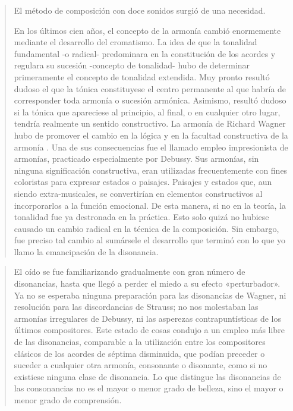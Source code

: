     \begin{quote}
    	El método de composición con doce sonidos surgió de una necesidad.
    	
    	En los últimos cien años, el concepto de la armonía cambió enormemente mediante el desarrollo del cromatismo. La idea de que la tonalidad fundamental -o radical- predominara en la constitución de los acordes y regulara su sucesión -concepto de tonalidad- hubo de determinar primeramente el concepto de tonalidad extendida. Muy pronto resultó dudoso el que la tónica constituyese el centro permanente al que habría de corresponder toda armonía o sucesión armónica. Asimismo, resultó dudoso si la tónica que apareciese al principio, al final, o en cualquier otro lugar, tendría realmente un sentido constructivo. La armonía de Richard Wagner hubo de promover el cambio en la lógica y en la facultad constructiva de la armonía . Una de sus consecuencias fue el llamado empleo impresionista de armonías, practicado especialmente por Debussy. Sus armonías, sin ninguna significación constructiva, eran utilizadas frecuentemente con fines coloristas para expresar estados o paisajes. Paisajes y estados que, aun siendo extra-musicales, se convertirían en elementos constructivos al incorporarlos a la función emocional. De esta manera, si no en la teoría, la tonalidad fue ya destronada en la práctica. Esto solo quizá no hubiese causado un cambio radical en la técnica de la composición. Sin embargo, fue preciso tal cambio al sumársele el desarrollo que terminó con lo que yo llamo la emancipación de la disonancia.
    \end{quote}
    
    \begin{quote}
    	El oído se fue familiarizando gradualmente con gran número de disonancias, hasta que llegó a perder el miedo a su efecto «perturbador». Ya no se esperaba ninguna preparación para las disonancias de Wagner, ni resolución para las discordancias de Strauss; no nos molestaban las armonías irregulares de Debussy, ni las asperezas contrapuntísticas de los últimos compositores. Este estado de cosas condujo a un empleo más libre de las disonancias, comparable a la utilización entre los compositores clásicos de los acordes de séptima disminuida, que podían preceder o suceder a cualquier otra armonía, consonante o disonante, como si no existiese ninguna clase de disonancia. Lo que distingue las disonancias de las consonancias no es el mayor o menor grado de belleza, sino el mayor o menor grado de comprensión.
    \end{quote}
        
